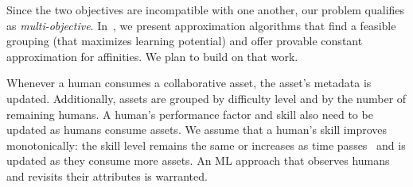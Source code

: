 \documentclass[11pt]{article}
\begin{document}
Since the two objectives are incompatible with one another, our problem qualifies as {\em multi-objective}. 
In~\cite{DBLP:conf/kdd/EsfandiariWAR19}, we present approximation algorithms that find a feasible grouping (that maximizes learning potential) and offer provable constant approximation for affinities. We plan to build on that work.



 
 Whenever a human consumes a collaborative asset, the asset's metadata is updated. Additionally, assets are grouped by difficulty level and by the number of remaining humans. 
A human's performance factor and skill also need to be updated as humans consume assets. We assume that a human's skill improves monotonically: the skill level remains the same or increases as time passes~\cite{ML13,UMK20} and is updated as they consume more assets. An ML approach that observes humans and revisits their attributes is warranted. 






\end{document}
